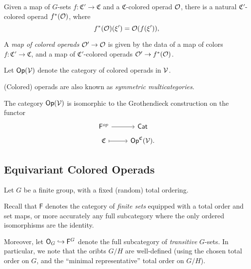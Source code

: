 \documentclass[a4paper,10pt
]{article}%
\renewcommand{\1}{\ensuremath{\mathbb{id}}}
\begin{document}
\begin{definition}
      \label{OP_MAP_DEFN}
      Given a map of $G$-sets $f: \mathfrak C' \to \mathfrak C$ and a $\mathfrak C$-colored operad $\mathcal{O}$,
      there is a natural $\mathfrak C'$-colored operad $f^*(\mathcal{O})$, where
      \begin{equation}
            f^{\**}(\O)(\xi') = \O(f(\xi')),
      \end{equation}

      A \textit{map of colored operads} $\mathcal{O}' \to \mathcal{O}$ is given by the data of a map of colors $f: \mathfrak C' \to \mathfrak C$,
      and a map of $\mathfrak C'$-colored operads $\mathcal{O}' \to f^*(\mathcal{O})$.
      
      Let $\mathsf{Op}(\mathcal V)$ denote the category of colored operads in $\mathcal V$.
\end{definition}

\begin{remark}
      (Colored) operads are also known as \textit{symmetric multicategories}.
\end{remark}

\begin{remark}
      The category $\mathsf{Op}(\mathcal V)$ is isomorphic to the Grothendieck construction on the functor
      \begin{equation}
            \begin{tikzcd}[row sep = tiny]
                  \mathsf F^{op} \arrow[r] & \mathsf{Cat}
                  \\
                  \mathfrak C \arrow[r, mapsto] & \Op^{\mathfrak C}(\V).
            \end{tikzcd}
      \end{equation}
\end{remark}




\subsection{Equivariant Colored Operads}

Let $G$ be a finite group, with a fixed (random) total ordering.
\begin{notation}
      [{cf. \cite{BP17}}]
      Recall that $\mathsf F$ denotes the category of \textit{finite sets} equipped with a total order and set maps,
      or more accurately any full subcategory where the only ordered isomorphisms are the identity.
      
      Moreover, let $\mathsf O_G \hookrightarrow \mathsf F^G$ denote the full subcategory of \textit{transitive} $G$-sets.
      In particular, we note that the oribts $G/H$ are well-defined (using the chosen total order on $G$,
      and the ``minimal representative'' total order on $G/H$).
\end{notation}
\end{document}

